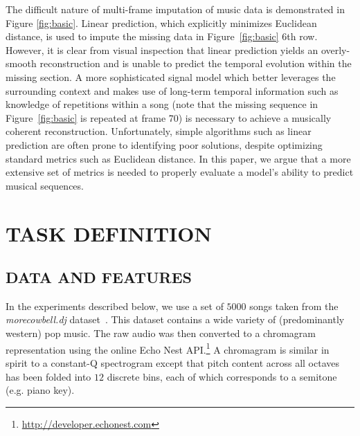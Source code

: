 \documentclass{article}
\begin{document}
The difficult nature of multi-frame imputation of music data is
demonstrated in Figure \ref{fig:basic}.
Linear prediction, which
explicitly minimizes Euclidean distance, is used to impute the missing
data in Figure~\ref{fig:basic} $6$th row.  However, it is clear from
visual inspection that linear prediction yields an overly-smooth
reconstruction and is unable to predict the temporal evolution within
the missing section.
%
A more sophisticated signal model which better leverages the
surrounding context and makes use of long-term temporal information
such as knowledge of repetitions within a song (note that the missing
sequence in Figure~\ref{fig:basic} is repeated at frame 70) is
necessary to achieve a musically coherent reconstruction.
%
Unfortunately, simple algorithms such as linear prediction are often
prone to identifying poor solutions, despite optimizing standard
metrics such as Euclidean distance.
%
In this paper, we argue that a more extensive set of metrics is needed
to properly evaluate a model's ability to predict musical sequences.


\section{TASK DEFINITION}
\label{sec:task}

\subsection{DATA AND FEATURES}
\label{ssec:feats}
In the experiments described below, we use a set of $5000$ songs taken
from the \emph{morecowbell.dj} dataset~\cite{Bertin-Mahieux2010a}.
This dataset contains a wide variety of (predominantly western) pop
music.  The raw audio was then converted to a chromagram
representation using the online Echo Nest
API.\footnote{\url{http://developer.echonest.com}} A chromagram is
similar in spirit to a \mbox{constant-Q} spectrogram except that pitch
content across all octaves has been folded into $12$ discrete bins,
each of which corresponds to a semitone (e.g. piano key).
%
\end{document}

